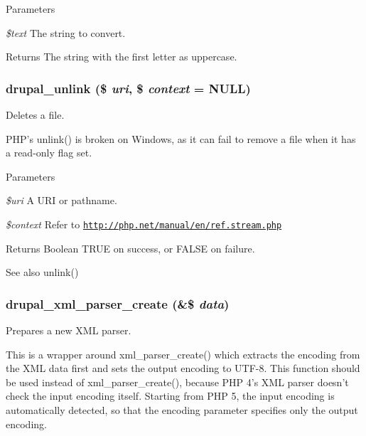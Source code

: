 \begin{DoxyParams}{Parameters}
\item[{\em \$text}]The string to convert.\end{DoxyParams}
\begin{DoxyReturn}{Returns}
The string with the first letter as uppercase. 
\end{DoxyReturn}
\hypertarget{group__php__wrappers_ga533bc32da8860919d20d60ada655e494}{
\subsubsection[{drupal\_\-unlink}]{\setlength{\rightskip}{0pt plus 5cm}drupal\_\-unlink (\$ {\em uri}, \/  \$ {\em context} = {\ttfamily NULL})}}
\label{group__php__wrappers_ga533bc32da8860919d20d60ada655e494}
Deletes a file.

PHP's unlink() is broken on Windows, as it can fail to remove a file when it has a read-\/only flag set.


\begin{DoxyParams}{Parameters}
\item[{\em \$uri}]A URI or pathname. \item[{\em \$context}]Refer to \href{http://php.net/manual/en/ref.stream.php}{\tt http://php.net/manual/en/ref.stream.php}\end{DoxyParams}
\begin{DoxyReturn}{Returns}
Boolean TRUE on success, or FALSE on failure.
\end{DoxyReturn}
\begin{DoxySeeAlso}{See also}
unlink() 
\end{DoxySeeAlso}
\hypertarget{group__php__wrappers_gab0e9cf694d0d48e586c117be348f1e24}{
\subsubsection[{drupal\_\-xml\_\-parser\_\-create}]{\setlength{\rightskip}{0pt plus 5cm}drupal\_\-xml\_\-parser\_\-create (\&\$ {\em data})}}
\label{group__php__wrappers_gab0e9cf694d0d48e586c117be348f1e24}
Prepares a new XML parser.

This is a wrapper around xml\_\-parser\_\-create() which extracts the encoding from the XML data first and sets the output encoding to UTF-\/8. This function should be used instead of xml\_\-parser\_\-create(), because PHP 4's XML parser doesn't check the input encoding itself. Starting from PHP 5, the input encoding is automatically detected, so that the encoding parameter specifies only the output encoding.

